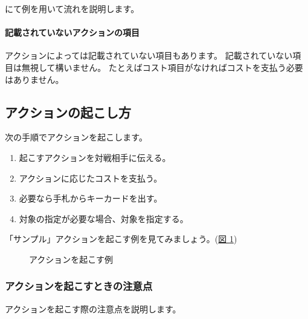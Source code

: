 \documentclass[letterpaper,10pt,dvipdfmx]{sphinxmanual}
\begin{document}
{\hyperref[\detokenize{common/03-action:action-flow}]{}} にて例を用いて流れを説明します。


\paragraph{記載されていないアクションの項目}
\label{\detokenize{common/03-action:id5}}
アクションによっては記載されていない項目もあります。
記載されていない項目は無視して構いません。
たとえばコスト項目がなければコストを支払う必要はありません。


\subsection{アクションの起こし方}
\label{\detokenize{common/03-action:action-howto}}\label{\detokenize{common/03-action:id6}}
次の手順でアクションを起こします。
\begin{enumerate}
%
\item {} 
起こすアクションを対戦相手に伝える。

\item {} 
アクションに応じたコストを支払う。

\item {} 
必要なら手札からキーカードを出す。

\item {} 
対象の指定が必要な場合、対象を指定する。

\end{enumerate}

「サンプル」アクションを起こす例を見てみましょう。(\hyperref[\detokenize{common/03-action:action-sample2}]{図 \ref{\detokenize{common/03-action:action-sample2}}})

\begin{figure}[htbp]
\centering
\capstart

\noindent{}
\caption{アクションを起こす例}\label{\detokenize{common/03-action:id34}}\label{\detokenize{common/03-action:action-sample2}}\end{figure}


\subsubsection{アクションを起こすときの注意点}
\label{\detokenize{common/03-action:id7}}
アクションを起こす際の注意点を説明します。
\end{document}
